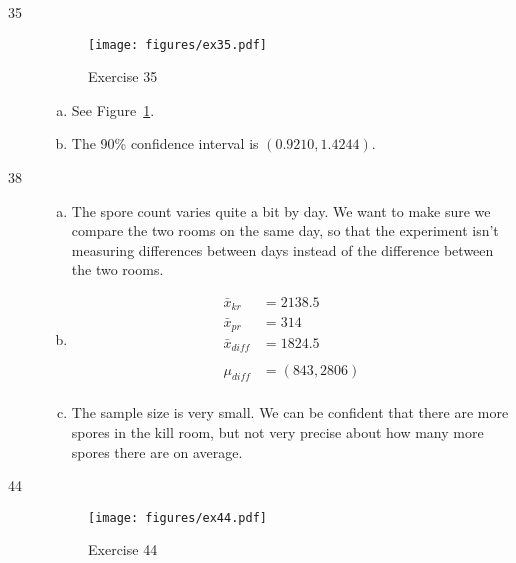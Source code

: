 \documentclass[letterpaper, landscape]{exam}
\begin{document}
\begin{description}
\begin{enumerate}[(a)]
        \end{enumerate}

      \item[35]
        \begin{figure}[H]
          \centering
          \texttt{[image: figures/ex35.pdf]}
          \caption{Exercise 35}\label{fig:ex35}
        \end{figure}

        \begin{enumerate}[(a)]
          \item See Figure~\ref{fig:ex35}. 
          \item The 90\% confidence interval is $(0.9210, 1.4244)$.
        \end{enumerate}

      \item[38]
        \begin{enumerate}[(a)]
          \item The spore count varies quite a bit by day. We want to make sure
            we compare the two rooms on the same day, so that the experiment
            isn't measuring differences between days instead of the difference
            between the two rooms.

          \item 
            \begin{align*}
              \bar{x}_{kr}   & = 2138.5 \\
              \bar{x}_{pr}   & = 314 \\
              \bar{x}_{diff} & = 1824.5 \\
              \\
              \mu_{diff} &= (843, 2806) \\
            \end{align*}

          \item The sample size is very small. We can be confident that there
            are more spores in the kill room, but not very precise about how
            many more spores there are on average.

        \end{enumerate}

      \item[44]
        \begin{figure}[H]
          \centering
          \texttt{[image: figures/ex44.pdf]}
          \caption{Exercise 44}\label{fig:ex44}
        \end{figure}


\end{description}
\end{document}
